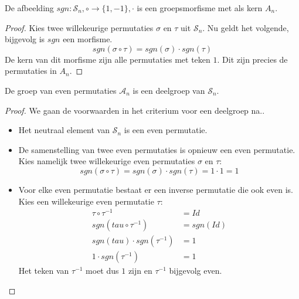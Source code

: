 \documentclass[main.tex]{subfiles}
\begin{document}
\begin{pr}
  \label{pr:sgn-groepsmorfisme}
  De afbeelding $sgn: \mathcal{S}_{n},\circ \rightarrow \{1,-1\},\cdot$ is een groepsmorfisme met als kern $A_{n}$.

  \begin{proof}
    Kies twee willekeurige permutaties $\sigma$ en $\tau$ uit $\mathcal{S}_{n}$.
    Nu geldt het volgende, bijgevolg is $sgn$ een morfisme.
    \[ sgn(\sigma \circ \tau) = sgn(\sigma) \cdot sgn(\tau) \]
    De kern van dit morfisme zijn alle permutaties met teken $1$.
    Dit zijn precies de permutaties in $A_{n}$.
  \end{proof}
\end{pr}
 
\begin{pr}
  De groep van even permutaties $\mathcal{A}_{n}$ is een deelgroep van $\mathcal{S}_{n}$.
  \begin{proof}
    We gaan de voorwaarden in het criterium voor een deelgroep na..
    \begin{itemize}
    \item Het neutraal element van $\mathcal{S}_{n}$ is een even permutatie.
    \item De samenstelling van twee even permutaties is opnieuw een even permutatie.
      Kies namelijk twee willekeurige even permutaties $\sigma$ en $\tau$:
      \[ sgn(\sigma \circ \tau) = sgn(\sigma) \cdot sgn(\tau) = 1 \cdot 1 = 1 \]
    \item Voor elke even permutatie bestaat er een inverse permutatie die ook even is.
      Kies een willekeurige even permutatie $\tau$:
      \[
      \begin{array}{rl}
        \tau \circ \tau^{-1} &= Id\\
        sgn(tau \circ \tau^{-1}) &= sgn(Id)\\
        sgn(tau) \cdot sgn(\tau^{-1}) &= 1\\
        1 \cdot sgn(\tau^{-1}) &= 1
      \end{array}
      \]
      Het teken van $\tau^{-1}$ moet dus $1$ zijn en $\tau^{-1}$ bijgevolg even.
    \end{itemize}
  \end{proof}
\end{pr}
\end{document}
